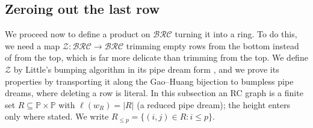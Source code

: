 \documentclass{amsart}
\theoremstyle{definition}
\theoremstyle{remark}
\numberwithin{equation}{subsection}
\newcommand{\wof}[1]{w_{#1}}
\newcommand{\zeromap}{\mathcal{Z}}
\newcommand{\BRC}{\mathcal{BRC}}
\begin{document}
\subsection{Zeroing out the last row}\label{section:bpd}

We proceed now to define a product on $\BRC$ turning it into a ring. To do this, we need a map $\zeromap:\BRC\to\BRC$ trimming empty rows from the bottom instead of from the top, which is far more delicate than trimming from the top. We define $\zeromap$ by Little's bumping algorithm \cite{little2003combinatorial} in its pipe dream form \cite{billey2019bijective}, and we prove its properties by transporting it along the Gao--Huang bijection \cite{GaoHuang2023} to bumpless pipe dreams, where deleting a row is literal. In this subsection an RC graph is a finite set $R\subseteq\mathbb P\times\mathbb P$ with $\ell(\wof R)=|R|$ (a reduced pipe dream); the height enters only where stated. We write $R_{\leq p}=\{(i,j)\in R:i\leq p\}$.
\end{document}
